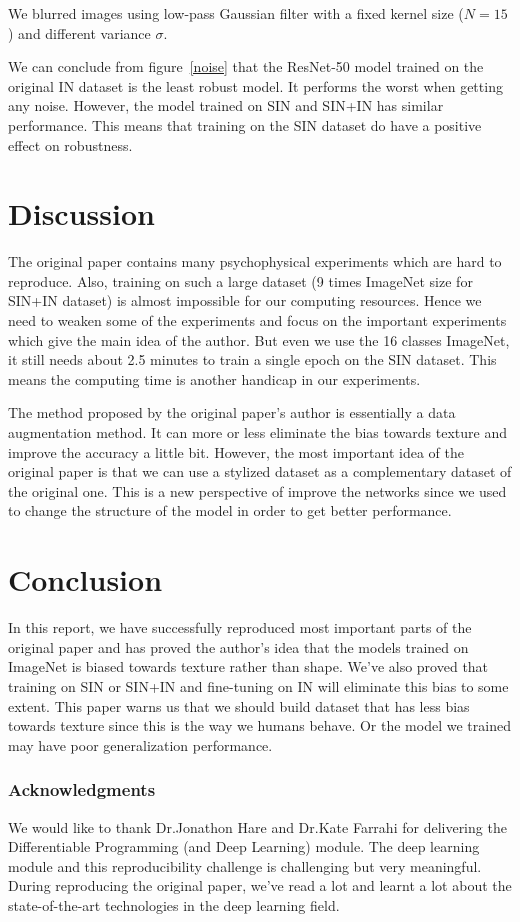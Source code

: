 \documentclass{article} %
\begin{document}
We blurred images using low-pass Gaussian filter with a fixed kernel size ($N=15$) and different variance $\sigma$.

We can conclude from figure~\ref{noise} that the ResNet-50 model trained on the original IN dataset is the least robust model. It performs the worst when getting any noise. However, the model trained on SIN and SIN+IN has similar performance. This means that training on the SIN dataset do have a positive effect on robustness.

\section{Discussion}

The original paper contains many psychophysical experiments which are hard to reproduce. Also, training on such a large dataset (9 times ImageNet size for SIN+IN dataset) is almost impossible for our computing resources. Hence we need to weaken some of the experiments and focus on the important experiments which give the main idea of the author. But even we use the 16 classes ImageNet, it still needs about 2.5 minutes to train a single epoch on the SIN dataset. This means the computing time is another handicap in our experiments.

The method proposed by the original paper's author is essentially a data augmentation method. It can more or less eliminate the bias towards texture and improve the accuracy a little bit. However, the most important idea of the original paper is that we can use a stylized dataset as a complementary dataset of the original one. This is a new perspective of improve the networks since we used to change the structure of the model in order to get better performance.


\section{Conclusion}

In this report, we have successfully reproduced most important parts of the original paper and has proved the author's idea that the models trained on ImageNet is biased towards texture rather than shape. We've also proved that training on SIN or SIN+IN and fine-tuning on IN will eliminate this bias to some extent. This paper warns us that we should build dataset that has less bias towards texture since this is the way we humans behave. Or the model we trained may have poor generalization performance.



\subsubsection*{Acknowledgments}

We would like to thank Dr.Jonathon Hare and Dr.Kate Farrahi for delivering the Differentiable Programming (and Deep Learning) module. The deep learning module and this reproducibility challenge is challenging but very meaningful. During reproducing the original paper, we've read a lot and learnt a lot about the state-of-the-art technologies in the deep learning field.



\end{document}
